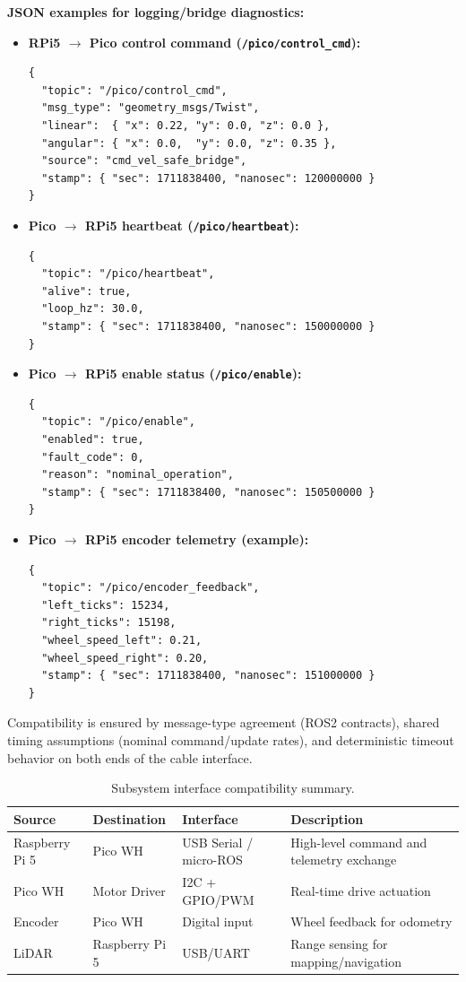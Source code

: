 \documentclass[12pt,a4paper]{report}
\begin{document}
\textbf{JSON examples for logging/bridge diagnostics:}
\begin{itemize}
    \item \textbf{RPi5 $\rightarrow$ Pico control command (\texttt{/pico/control\_cmd}):}
\begin{verbatim}
{
  "topic": "/pico/control_cmd",
  "msg_type": "geometry_msgs/Twist",
  "linear":  { "x": 0.22, "y": 0.0, "z": 0.0 },
  "angular": { "x": 0.0,  "y": 0.0, "z": 0.35 },
  "source": "cmd_vel_safe_bridge",
  "stamp": { "sec": 1711838400, "nanosec": 120000000 }
}
\end{verbatim}

    \item \textbf{Pico $\rightarrow$ RPi5 heartbeat (\texttt{/pico/heartbeat}):}
\begin{verbatim}
{
  "topic": "/pico/heartbeat",
  "alive": true,
  "loop_hz": 30.0,
  "stamp": { "sec": 1711838400, "nanosec": 150000000 }
}
\end{verbatim}

    \item \textbf{Pico $\rightarrow$ RPi5 enable status (\texttt{/pico/enable}):}
\begin{verbatim}
{
  "topic": "/pico/enable",
  "enabled": true,
  "fault_code": 0,
  "reason": "nominal_operation",
  "stamp": { "sec": 1711838400, "nanosec": 150500000 }
}
\end{verbatim}

    \item \textbf{Pico $\rightarrow$ RPi5 encoder telemetry (example):}
\begin{verbatim}
{
  "topic": "/pico/encoder_feedback",
  "left_ticks": 15234,
  "right_ticks": 15198,
  "wheel_speed_left": 0.21,
  "wheel_speed_right": 0.20,
  "stamp": { "sec": 1711838400, "nanosec": 151000000 }
}
\end{verbatim}
\end{itemize}

Compatibility is ensured by message-type agreement (ROS2 contracts), shared timing assumptions (nominal command/update rates), and deterministic timeout behavior on both ends of the cable interface.

\begin{table}[H]
\centering
\caption{Subsystem interface compatibility summary.}
\label{tab:compatibility}
\begin{tabularx}{\textwidth}{|p{3cm}|p{3cm}|p{2.5cm}|X|}
\hline
\textbf{Source} & \textbf{Destination} & \textbf{Interface} & \textbf{Description} \\
\hline
Raspberry Pi 5 & Pico WH & USB Serial / micro-ROS & High-level command and telemetry exchange \\
\hline
Pico WH & Motor Driver & I2C + GPIO/PWM & Real-time drive actuation \\
\hline
Encoder & Pico WH & Digital input & Wheel feedback for odometry \\
\hline
LiDAR & Raspberry Pi 5 & USB/UART & Range sensing for mapping/navigation \\
\hline
\end{tabularx}
\end{table}
\end{document}
